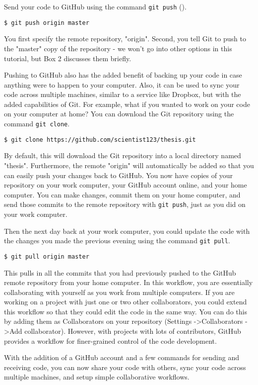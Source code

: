 Send your code to GitHub using the command \verb|git push| (\label{fig:Fig2}).

\begin{lstlisting}
$ git push origin master
\end{lstlisting}

You first specify the remote repository, "origin".
Second, you tell Git to push to the "master" copy of the repository - we won’t go into other options in this tutorial, but Box 2 discusses them briefly.

Pushing to GitHub also has the added benefit of backing up your code in case anything were to happen to your computer.
Also, it can be used to sync your code across multiple machines, similar to a service like Dropbox, but with the added capabilities of Git.
For example, what if you wanted to work on your code on your computer at home?
You can download the Git repository using the command \verb|git clone|.

\begin{lstlisting}
$ git clone https://github.com/scientist123/thesis.git
\end{lstlisting}

By default, this will download the Git repository into a local directory named "thesis".
Furthermore, the remote "origin" will automatically be added so that you can easily push your changes back to GitHub.
You now have copies of your repository on your work computer, your GitHub account online, and your home computer.
You can make changes, commit them on your home computer, and send those commits to the remote repository with \verb|git push|, just as you did on your work computer.

Then the next day back at your work computer, you could update the code with the changes you made the previous evening using the command \verb|git pull|.

\begin{lstlisting}
$ git pull origin master
\end{lstlisting}

This pulls in all the commits that you had previously pushed to the GitHub remote repository from your home computer.
In this workflow, you are essentially collaborating with yourself as you work from multiple computers.
If you are working on a project with just one or two other collaborators, you could extend this workflow so that they could edit the code in the same way.
You can do this by adding them as Collaborators on your repository (Settings -\textgreater Collaborators -\textgreater Add collaborator).
However, with projects with lots of contributors, GitHub provides a workflow for finer-grained control of the code development.

With the addition of a GitHub account and a few commands for sending and receiving code, you can now share your code with others, sync your code across multiple machines, and setup simple collaborative workflows.